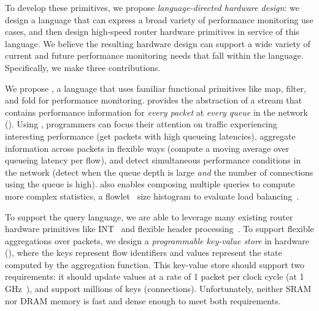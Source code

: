To develop these primitives, we propose {\em language-directed hardware design}: we design a
language that can express a broad variety of performance monitoring use cases,
and then design high-speed router hardware primitives in service of this
language.
We believe the resulting hardware design can support a wide variety of current
and future performance monitoring needs that fall within the language. Specifically,
we make three contributions.

 We propose {\em \TheSystem}, a language that
uses familiar functional primitives like {\ct map}, {\ct filter}, and {\ct fold} for
performance monitoring.  \TheSystem provides the abstraction of a stream that
contains performance information for {\em every packet} at {\em every queue} in
the network (). Using \TheSystem, programmers can focus their
attention on traffic experiencing interesting performance (\eg get packets with
high queueing latencies), aggregate information across packets in flexible ways
(\eg compute a moving average over queueing latency per flow), and detect
simultaneous performance conditions in the network (\eg detect when the queue
depth is large {\em and} the number of connections using the queue is high).
\TheSystem also enables composing multiple queries to compute more complex
statistics, \eg a flowlet~\cite{flowlets} size histogram to evaluate
load balancing~\cite{conga}.

 To support the \TheSystem query
language, we are able to leverage many existing router hardware primitives like
INT~\cite{int} and flexible header processing~\cite{rmt}. To support flexible
aggregations over packets, we design a {\em programmable key-value store} in
hardware (), where the keys represent flow identifiers and values
represent the state computed by the aggregation function. This key-value store
should support two requirements: it should update values at a rate of 1
packet per clock cycle (at 1 GHz~\cite{rmt}), and support millions
of keys (\ie connections). Unfortunately, neither SRAM nor DRAM memory is fast
and dense enough to meet both requirements.

